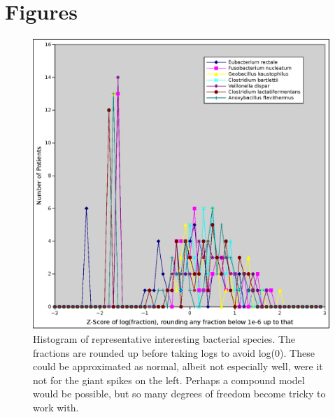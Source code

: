 \documentclass[twocolumn,12pt]{article}
\begin{document}
\newpage
\onecolumn
\section{Figures}

\begin{figure}[h!]
  \includegraphics[width=\textwidth]{nonnormal}
  \caption{Histogram of representative interesting bacterial species.
    The fractions are rounded up before taking logs to avoid log(0).
    These could be approximated as normal, albeit not especially well,
    were it not for the giant spikes on the left.  Perhaps a compound
    model would be possible, but so many degrees of freedom become
    tricky to work with.}
  \label{nonnormal}
\end{figure}
  
\end{document}
